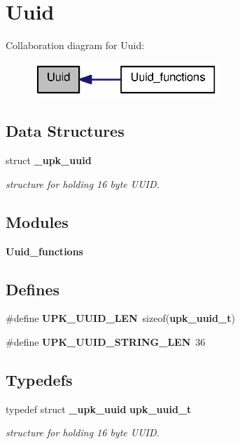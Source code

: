 \section{Uuid}
\label{group__uuid}
Collaboration diagram for Uuid:\nopagebreak
\begin{figure}[H]
\begin{center}
\leavevmode
\includegraphics[width=198pt]{group__uuid}
\end{center}
\end{figure}
\subsection*{Data Structures}
\begin{DoxyCompactItemize}
\item 
struct {\bf \_\-upk\_\-uuid}
\begin{DoxyCompactList}\small\item\em structure for holding 16 byte UUID. \end{DoxyCompactList}\end{DoxyCompactItemize}
\subsection*{Modules}
\begin{DoxyCompactItemize}
\item 
{\bf Uuid\_\-functions}
\end{DoxyCompactItemize}
\subsection*{Defines}
\begin{DoxyCompactItemize}
\item 
\#define {\bf UPK\_\-UUID\_\-LEN}~sizeof({\bf upk\_\-uuid\_\-t})
\item 
\#define {\bf UPK\_\-UUID\_\-STRING\_\-LEN}~36
\end{DoxyCompactItemize}
\subsection*{Typedefs}
\begin{DoxyCompactItemize}
\item 
typedef struct {\bf \_\-upk\_\-uuid} {\bf upk\_\-uuid\_\-t}
\begin{DoxyCompactList}\small\item\em structure for holding 16 byte UUID. \end{DoxyCompactList}\end{DoxyCompactItemize}


